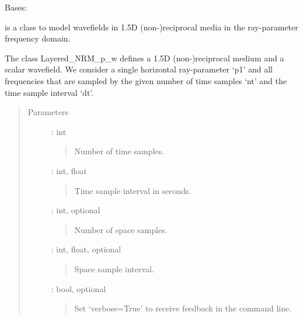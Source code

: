 \documentclass[letterpaper,10pt,english]{sphinxmanual}
\begin{document}
\begin{fulllineitems}
\label{\detokenize{Layered_NRM_p_w:Layered_NRM_p_w.Layered_NRM_p_w}}
Bases: {\hyperref[\detokenize{Wavefield_NRM_p_w:Wavefield_NRM_p_w.Wavefield_NRM_p_w}]{}}

is a class to model wavefields in 1.5D (non-)reciprocal media in the ray-parameter frequency domain.

The class Layered\_NRM\_p\_w defines a 1.5D (non-)reciprocal medium and a scalar wavefield. We consider a single horizontal ray-parameter ‘p1’ and all frequencies that are sampled by the given number of time samples ‘nt’ and the time sample interval ‘dt’.
\begin{quote}\begin{description}
\item[{Parameters}] \leavevmode
{} : int
\begin{quote}

Number of time samples.
\end{quote}

 : int, float
\begin{quote}

Time sample interval in seconds.
\end{quote}

 : int, optional
\begin{quote}

Number of space samples.
\end{quote}

 : int, float, optional
\begin{quote}

Space sample interval.
\end{quote}

 : bool, optional
\begin{quote}

Set ‘verbose=True’ to receive feedback in the command line.
\end{quote}


\end{description}
\end{quote}
\end{fulllineitems}
\end{document}
